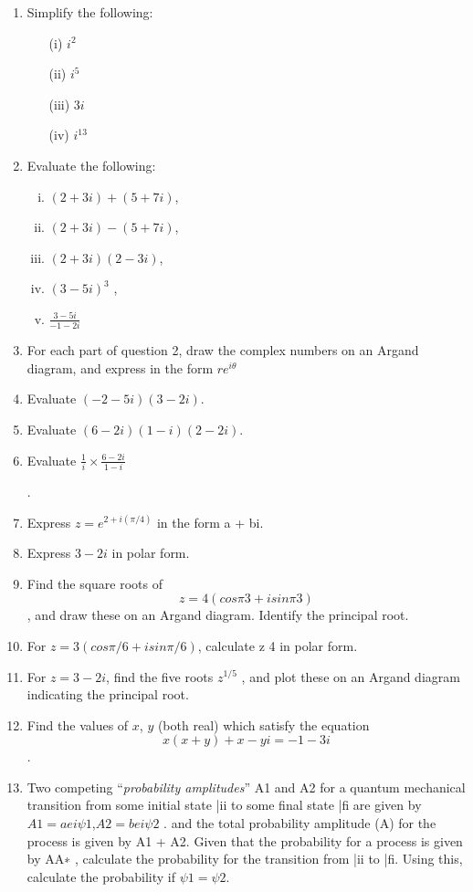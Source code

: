 \documentclass[12pt, a4paper]{report}
\theoremstyle{plain}
\theoremstyle{definition}
\theoremstyle{remark}
\begin{document}
\begin{enumerate}
\item Simplify the following:
\begin{multicols}{2}
\begin{itemize}
	\item[(i)]  $i^2$
	\item[(ii)]  $i^5$
	\item[(iii)]  $3i$
	\item[(iv)]  $i^13$
\end{itemize}
\end{multicols}
\item Evaluate the following:
\begin{multicols}{2}
\begin{enumerate}[(i)]
	\item $(2 + 3i) + (5 + 7i)$,
	\item $(2 + 3i) − (5 + 7i)$,
	\item $(2 + 3i)(2 − 3i)$,
	\item $(3 − 5i)^3$
	,
	\item ${\displaystyle \frac{3 − 5i}{	−1 − 2i} }$


\end{enumerate}
\end{multicols}


\item For each part of question 2, draw the complex numbers on an Argand diagram, and express in
the form $re^{i\theta}$

\item Evaluate $(-2 - 5i)(3- 2i)$.
\item Evaluate $(6 - 2i)(1 - i)(2 - 2i)$.
\item Evaluate 
${\displaystyle \frac{1}{i} \times \frac{6-2i}{1-i} }$


.
\item Express $z = e^{2+i(\pi/4)}$ in the form a + bi.
\item Express $3 - 2i$ in polar form.
\item Find the square roots of \[z = 4(cos π
3 + isin π
3
)\], and draw these on an Argand diagram. Identify
the principal root.
\item For $z = 3(cos \pi/6 + isin \pi/6)$, calculate z
4
in polar form.
\item For $z = 3 - 2i$, find the five roots $z^{1/5}$
, and plot these on an Argand diagram indicating the
principal root.


\item Find the values of $x$, $y$ (both real) which satisfy the equation \[ x(x + y) + x − yi = −1 − 3i\].
\item Two competing “\textit{probability amplitudes}” A1 and A2 for a quantum mechanical transition from
some initial state |ii to some final state |fi are given by
$A1 = aei\psi1$,$ A2 = bei\psi2$
.
and the total probability amplitude (A) for the process is given by A1 + A2. Given that the probability
for a process is given by AA∗
, calculate the probability for the transition from |ii to |fi.
Using this, calculate the probability if $\psi1 = \psi2$.


\end{enumerate}
\end{document}
